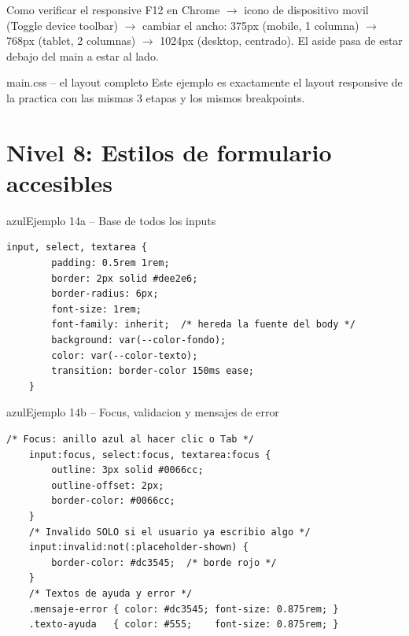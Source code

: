 \documentclass[11pt,a4paper]{article}
\begin{document}
	\begin{cajaresultado}{Como verificar el responsive}
		F12 en Chrome $\to$ icono de dispositivo movil (Toggle device toolbar) $\to$ cambiar el ancho: 375px (mobile, 1 columna) $\to$ 768px (tablet, 2 columnas) $\to$ 1024px (desktop, centrado). El aside pasa de estar debajo del main a estar al lado.
	\end{cajaresultado}
	
	\begin{cajapractica}{main.css -- el layout completo}
		Este ejemplo es exactamente el layout responsive de la practica con las mismas 3 etapas y los mismos breakpoints.
	\end{cajapractica}
	
	\section{Nivel 8: Estilos de formulario accesibles}
	
	\begin{cajacodigo}{azul}{Ejemplo 14a -- Base de todos los inputs}
		\begin{lstlisting}[style=codecss]
	input, select, textarea {
		padding: 0.5rem 1rem;
		border: 2px solid #dee2e6;
		border-radius: 6px;
		font-size: 1rem;
		font-family: inherit;  /* hereda la fuente del body */
		background: var(--color-fondo);
		color: var(--color-texto);
		transition: border-color 150ms ease;
	} \end{lstlisting}
	\end{cajacodigo}
	
	\begin{cajacodigo}{azul}{Ejemplo 14b -- Focus, validacion y mensajes de error}
		\begin{lstlisting}[style=codecss]
	/* Focus: anillo azul al hacer clic o Tab */
	input:focus, select:focus, textarea:focus {
		outline: 3px solid #0066cc;
		outline-offset: 2px;
		border-color: #0066cc;
	}
	/* Invalido SOLO si el usuario ya escribio algo */
	input:invalid:not(:placeholder-shown) {
		border-color: #dc3545;  /* borde rojo */
	}
	/* Textos de ayuda y error */
	.mensaje-error { color: #dc3545; font-size: 0.875rem; }
	.texto-ayuda   { color: #555;    font-size: 0.875rem; } \end{lstlisting}
	\end{cajacodigo}
	
\end{document}
